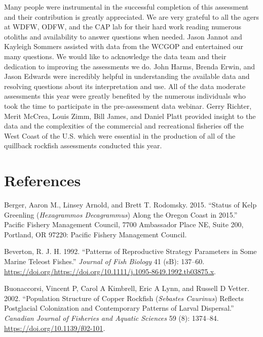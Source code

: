 \documentclass[11pt,
  english,
  a4paper,
]{article}
\begin{document}
Many people were instrumental in the successful completion of this assessment and their contribution is greatly appreciated. We are very grateful to all the agers at WDFW, ODFW, and the CAP lab for their hard work reading numerous otoliths and availability to answer questions when needed. Jason Jannot and Kayleigh Sommers assisted with data from the WCGOP and entertained our many questions. We would like to acknowledge the data team and their dedication to improving the assessments we do. John Harms, Brenda Erwin, and Jason Edwards were incredibly helpful in understanding the available data and resolving questions about its interpretation and use. All of the data moderate assessments this year were greatly benefited by the numerous individuals who took the time to participate in the pre-assessment data webinar. Gerry Richter, Merit McCrea, Louis Zimm, Bill James, and Daniel Platt provided insight to the data and the complexities of the commercial and recreational fisheries off the West Coast of the U.S. which were essential in the production of all of the quillback rockfish assessments conducted this year.

\leavevmode\tagmcend\tagstructend\par

\clearpage


\hypertarget{references}{%
\section{References}\label{references}}

\leavevmode\tagmcend\tagstructend


\hypertarget{refs}{}
\leavevmode\hypertarget{ref-berger_kelpgreenling_2015}{}%
Berger, Aaron M., Linsey Arnold, and Brett T. Rodomsky. 2015. ``Status of Kelp Greenling (\emph{Hexagrammos Decagrammus}) Along the Oregon Coast in 2015.'' Pacific Fishery Management Council, 7700 Ambassador Place NE, Suite 200, Portland, OR 97220: Pacific Fishery Management Council.

\leavevmode\hypertarget{ref-Beverton1992}{}%
Beverton, R. J. H. 1992. ``Patterns of Reproductive Strategy Parameters in Some Marine Teleost Fishes.'' \emph{Journal of Fish Biology} 41 (sB): 137--60. \url{https://doi.org/https://doi.org/10.1111/j.1095-8649.1992.tb03875.x}.

\leavevmode\hypertarget{ref-buonaccorsi_population_2002}{}%
Buonaccorsi, Vincent P, Carol A Kimbrell, Eric A Lynn, and Russell D Vetter. 2002. ``Population Structure of Copper Rockfish (\emph{Sebastes Caurinus}) Reflects Postglacial Colonization and Contemporary Patterns of Larval Dispersal.'' \emph{Canadian Journal of Fisheries and Aquatic Sciences} 59 (8): 1374--84. \url{https://doi.org/10.1139/f02-101}.
\end{document}
